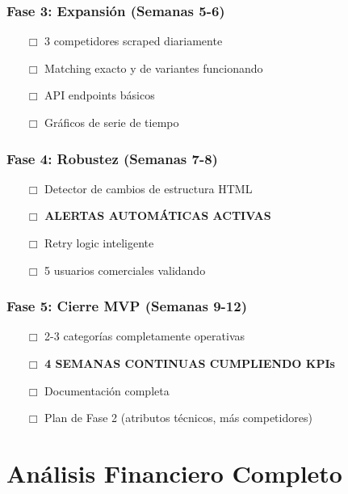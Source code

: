 \documentclass[12pt,a4paper]{article}
\begin{document}
\subsubsection*{Fase 3: Expansión (Semanas 5-6)}
\begin{itemize}[leftmargin=*]
    \item[$\Box$] 3 competidores scraped diariamente
    \item[$\Box$] Matching exacto y de variantes funcionando
    \item[$\Box$] API endpoints básicos
    \item[$\Box$] Gráficos de serie de tiempo
\end{itemize}

\subsubsection*{Fase 4: Robustez (Semanas 7-8)}
\begin{itemize}[leftmargin=*]
    \item[$\Box$] Detector de cambios de estructura HTML
    \item[$\Box$] \textcolor{primaryblue}{\textbf{ALERTAS AUTOMÁTICAS ACTIVAS}}
    \item[$\Box$] Retry logic inteligente
    \item[$\Box$] 5 usuarios comerciales validando
\end{itemize}

\subsubsection*{Fase 5: Cierre MVP (Semanas 9-12)}
\begin{itemize}[leftmargin=*]
    \item[$\Box$] 2-3 categorías completamente operativas
    \item[$\Box$] \textcolor{successgreen}{\textbf{4 SEMANAS CONTINUAS CUMPLIENDO KPIs}}
    \item[$\Box$] Documentación completa
    \item[$\Box$] Plan de Fase 2 (atributos técnicos, más competidores)
\end{itemize}

\newpage
\section{Análisis Financiero Completo}
\end{document}
